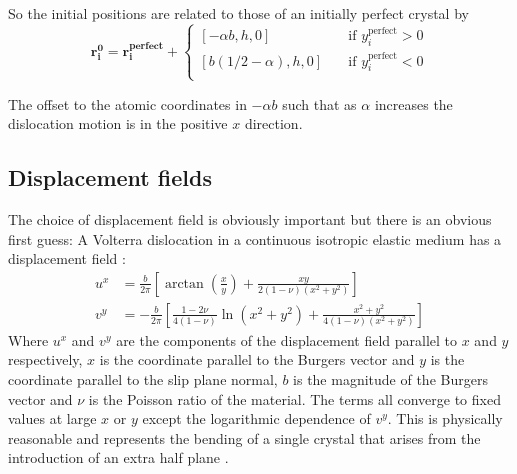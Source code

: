 So the initial positions are related to those of an initially perfect crystal by
\begin{equation}
\bm{r_i^0} = \bm{r_i^{\text{perfect}}} +\begin{cases}
[-\alpha{}b, h, 0] & \quad \text{if } y_i^{\text{perfect}} > 0\\
[b(1/2 - \alpha{}), h, 0] & \quad \text{if } y_i^{\text{perfect}} < 0\\
\end{cases} 
\end{equation}

The offset to the atomic coordinates in $-\alpha{}b$ such that as $\alpha$ increases the dislocation motion is in the positive $x$ direction.





\FloatBarrier














\subsection{Displacement fields}

The choice of displacement field is obviously important but there is an obvious first guess: A Volterra dislocation in a continuous isotropic elastic medium has a displacement field \cite{hirth_lothe1982volterra_displacements}:
\begin{subequations}
\begin{align}
u^x &= \frac{b}{2\pi}\left[ \arctan\left(\frac{x}{y}\right) + \frac{xy}{2(1-\nu)(x^2 + y^2)} \right] \\[0.5ex]
v^y &= -\frac{b}{2\pi} \left[ \frac{1-2\nu}{4(1-\nu)} \ln(x^2 + y^2) + \frac{x^2 + y^2}{4(1-\nu)(x^2 + y^2)} \right]
\end{align}
\end{subequations}
Where $u^x$ and $v^y$ are the components of the displacement field parallel to $x$ and $y$ respectively, $x$ is the coordinate parallel to the Burgers vector and $y$ is the coordinate parallel to the slip plane normal, $b$ is the magnitude of the Burgers vector and $\nu$ is the Poisson ratio of the material. The terms all converge to fixed values at large $x$ or $y$ except the logarithmic dependence of $v^y$. This is physically reasonable and represents the bending of a single crystal that arises from the introduction of an extra half plane \cite{hirth_lothe1982volterra_displacements}.

